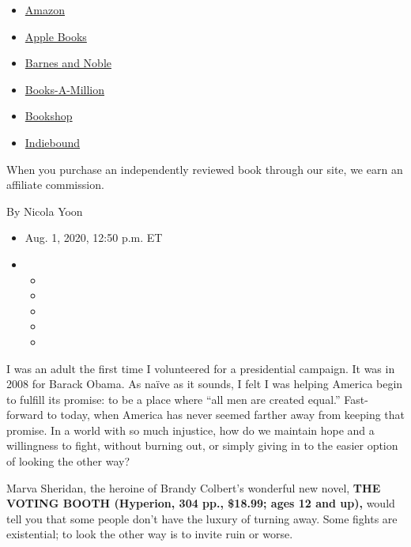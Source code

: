 \begin{itemize}
\tightlist
\item
  \href{https://www.amazon.com/gp/search?index=books\&tag=NYTBSREV-20\&field-keywords=The+Voting+Booth+Brandy+Colbert}{Amazon}
\item
  \href{https://du-gae-books-dot-nyt-du-prd.appspot.com/buy?title=The+Voting+Booth\&author=Brandy+Colbert}{Apple
  Books}
\item
  \href{https://www.anrdoezrs.net/click-7990613-11819508?url=https\%3A\%2F\%2Fwww.barnesandnoble.com\%2Fw\%2F\%3Fean\%3D9781368053297}{Barnes
  and Noble}
\item
  \href{https://www.anrdoezrs.net/click-7990613-35140?url=https\%3A\%2F\%2Fwww.booksamillion.com\%2Fp\%2FThe\%2BVoting\%2BBooth\%2FBrandy\%2BColbert\%2F9781368053297}{Books-A-Million}
\item
  \href{https://bookshop.org/a/3546/9781368053297}{Bookshop}
\item
  \href{https://www.indiebound.org/book/9781368053297?aff=NYT}{Indiebound}
\end{itemize}

When you purchase an independently reviewed book through our site, we
earn an affiliate commission.

By Nicola Yoon

\begin{itemize}
\item
  Aug. 1, 2020, 12:50 p.m. ET
\item
  \begin{itemize}
  \item
  \item
  \item
  \item
  \item
  \end{itemize}
\end{itemize}

I was an adult the first time I volunteered for a presidential campaign.
It was in 2008 for Barack Obama. As naïve as it sounds, I felt I was
helping America begin to fulfill its promise: to be a place where ``all
men are created equal.'' Fast-forward to today, when America has never
seemed farther away from keeping that promise. In a world with so much
injustice, how do we maintain hope and a willingness to fight, without
burning out, or simply giving in to the easier option of looking the
other way?

Marva Sheridan, the heroine of Brandy Colbert's wonderful new novel,
\textbf{THE VOTING BOOTH (Hyperion, 304 pp., \$18.99; ages 12 and up),}
would tell you that some people don't have the luxury of turning away.
Some fights are existential; to look the other way is to invite ruin or
worse.

